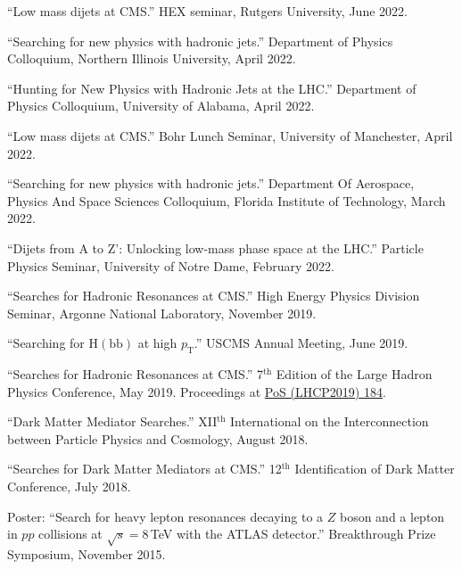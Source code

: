 \documentclass[12pt]{article} %
\begin{document}
\smallskip

``Low mass dijets at CMS.'' HEX seminar, Rutgers University, June 2022.

\smallskip

``Searching for new physics with hadronic jets.'' Department of Physics Colloquium, Northern Illinois University, April 2022.

\smallskip

``Hunting for New Physics with Hadronic Jets at the LHC.'' Department of Physics Colloquium, University of Alabama, April 2022.

\smallskip

``Low mass dijets at CMS.'' Bohr Lunch Seminar, University of Manchester, April 2022.

\smallskip

``Searching for new physics with hadronic jets.'' Department Of Aerospace, Physics And Space Sciences Colloquium, Florida Institute of Technology, March 2022.

\smallskip

``Dijets from A to Z': Unlocking low-mass phase space at the LHC.'' Particle Physics Seminar, University of Notre Dame, February 2022. 

\smallskip

``Searches for Hadronic Resonances at CMS.'' High Energy Physics Division Seminar, Argonne National Laboratory, November 2019.

\smallskip

``Searching for $\mathrm{H}(\mathrm{bb})$ at high $p_{\mathrm{T}}$.'' USCMS Annual Meeting, June 2019.

\smallskip

``Searches for Hadronic Resonances at CMS.'' 7$^{\mathrm{th}}$ Edition of the Large Hadron Physics Conference, May 2019. Proceedings at \href{https://doi.org/10.22323/1.350.0184}{PoS (LHCP2019) 184}.

\smallskip

``Dark Matter Mediator Searches.'' XII$^{\mathrm{th}}$ International on the Interconnection between Particle Physics and Cosmology, August 2018.

\smallskip

``Searches for Dark Matter Mediators at CMS.'' 12$^{\mathrm{th}}$ Identification of Dark Matter Conference, July 2018.

\smallskip

Poster: ``Search for heavy lepton resonances decaying to a $Z$ boson and a lepton in $pp$ collisions at $\sqrt{s}=8$\,TeV with the ATLAS detector.'' Breakthrough Prize Symposium, November 2015.
\end{document}
